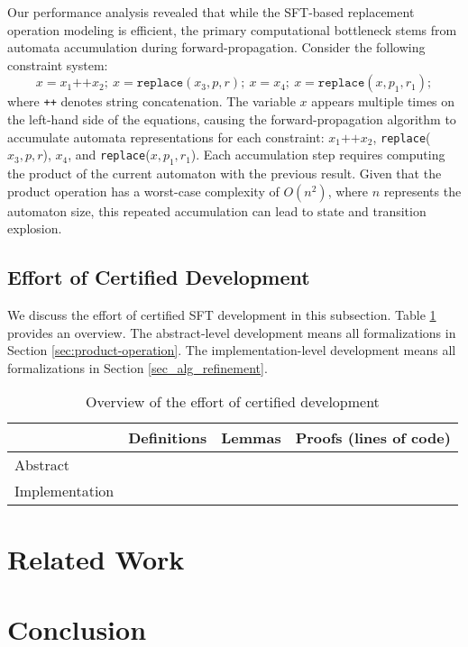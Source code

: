 \documentclass[a4paper,UKenglish,cleveref, autoref, anonymous, thm-restate]{lipics-v2021}
\begin{document}
Our performance analysis revealed that while the SFT-based replacement operation modeling is efficient, the primary computational bottleneck stems from automata accumulation during forward-propagation. Consider the following constraint system:
\[
x = x_1\texttt{++}x_2;~x = \texttt{replace}(x_3, p, r);~x = x_4;~x = \texttt{replace}(x, p_1, r_1);
\]
where \texttt{++} denotes string concatenation. The variable $x$ appears multiple times on the left-hand side of the equations, causing the forward-propagation algorithm to accumulate automata representations for each constraint: $x_1\texttt{++}x_2$, \texttt{replace}($x_3, p, r$), $x_4$, and \texttt{replace}($x, p_1, r_1$). Each accumulation step requires computing the product of the current automaton with the previous result. Given that the product operation has a worst-case complexity of $O(n^2)$, where $n$ represents the automaton size, this repeated accumulation can lead to state and transition explosion.


\subsection{Effort of Certified Development}

We discuss the effort of certified SFT development in this subsection.
Table \ref{tab:abstract_impl} provides an overview. The abstract-level development means all formalizations in Section \ref{sec:product-operation}. The implementation-level development means all formalizations in Section \ref{sec_alg_refinement}.

\begin{table}[h]
  \centering
  \begin{tabular}{lccc}
      \toprule
      & \textbf{Definitions} & \textbf{Lemmas} & \textbf{Proofs} (lines of code) \\
      \midrule
      Abstract & & & \\
      Implementation & & & \\
      \bottomrule
  \end{tabular}
  \caption{Overview of the effort of certified development}
  \label{tab:abstract_impl}
\end{table}


\section{Related Work}
\label{sec:related-work}


\section{Conclusion}
\label{sec:conclusion}



\end{document}
